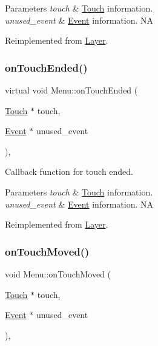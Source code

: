 \begin{DoxyParams}{Parameters}
{\em touch} & \hyperlink{classTouch}{Touch} information. \\
\hline
{\em unused\+\_\+event} & \hyperlink{classEvent}{Event} information.  NA \\
\hline
\end{DoxyParams}


Reimplemented from \hyperlink{classLayer_a9dbcca0eab3b0cd3cdc279615c604413}{Layer}.

\mbox{\label{classMenu_ab8d24a11ed99eead18acd6376a0a3d76}} 
\subsubsection{\texorpdfstring{on\+Touch\+Ended()}{onTouchEnded()}\hspace{0.1cm}{\footnotesize\ttfamily [2/2]}}
{\footnotesize\ttfamily virtual void Menu\+::on\+Touch\+Ended (\begin{DoxyParamCaption}\item[{\hyperlink{classTouch}{Touch} $\ast$}]{touch,  }\item[{\hyperlink{classEvent}{Event} $\ast$}]{unused\+\_\+event }\end{DoxyParamCaption})\hspace{0.3cm}{\ttfamily [override]}, {\ttfamily [virtual]}}

Callback function for touch ended.


\begin{DoxyParams}{Parameters}
{\em touch} & \hyperlink{classTouch}{Touch} information. \\
\hline
{\em unused\+\_\+event} & \hyperlink{classEvent}{Event} information.  NA \\
\hline
\end{DoxyParams}


Reimplemented from \hyperlink{classLayer_a9dbcca0eab3b0cd3cdc279615c604413}{Layer}.

\mbox{\label{classMenu_ad69115ad80e86bbe904d575253afc781}} 
\subsubsection{\texorpdfstring{on\+Touch\+Moved()}{onTouchMoved()}\hspace{0.1cm}{\footnotesize\ttfamily [1/2]}}
{\footnotesize\ttfamily void Menu\+::on\+Touch\+Moved (\begin{DoxyParamCaption}\item[{\hyperlink{classTouch}{Touch} $\ast$}]{touch,  }\item[{\hyperlink{classEvent}{Event} $\ast$}]{unused\+\_\+event }\end{DoxyParamCaption})\hspace{0.3cm}{\ttfamily [override]}, {\ttfamily [virtual]}}


